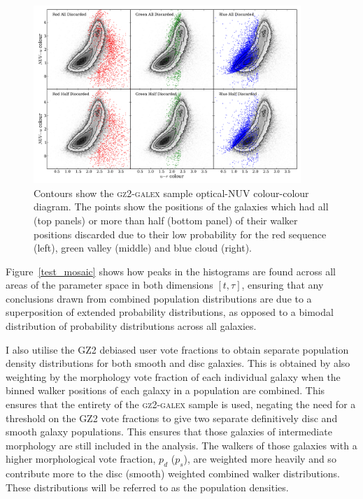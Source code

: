 \begin{figure}
\includegraphics[width=0.9\textwidth]{starpy/discarded_galaxy_colour_colour.pdf}
\caption[Colours of discarded galaxies]{Contours show the \textsc{gz2-galex} sample optical-NUV colour-colour diagram. The points show the positions of the galaxies which had all (top panels) or more than half (bottom panel) of their walker positions discarded due to their low probability for the red sequence (left), green valley (middle) and blue cloud (right).}
\label{discarded}
\end{figure}

Figure~\ref{test_mosaic} shows how peaks in the histograms are found across all areas of the parameter space in both dimensions $[t, \tau]$, ensuring that any conclusions drawn from combined population distributions are due to a superposition of extended probability distributions, as opposed to a bimodal distribution of probability distributions across all galaxies.

I also utilise the GZ2 debiased user vote fractions to obtain separate population density distributions for both smooth and disc galaxies. This is obtained by also weighting by the morphology vote fraction of each individual galaxy when the binned walker positions of each galaxy in a population are combined. This ensures that the entirety of the \textsc{gz2-galex} sample is used, negating the need for a threshold on the GZ2 vote fractions \citep[e.g., $p_d > 0.8$ as used in][]{schawinski14} to give two separate definitively disc and smooth galaxy populations. This ensures that those galaxies of intermediate morphology are still included in the analysis. The walkers of those galaxies with a higher morphological vote fraction, $p_d$ ($p_s$), are weighted more heavily and so contribute more to the disc (smooth) weighted combined walker distributions. These distributions will be referred to as the population densities.


